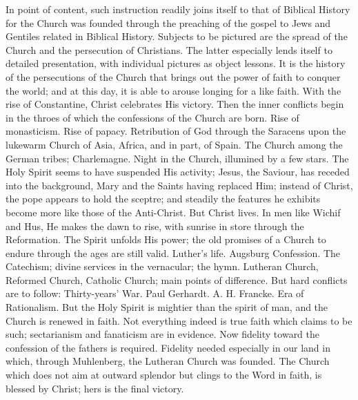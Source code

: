 In point of content, such instruction readily joins itself to that of Biblical History for the Church was founded through the preaching of the gospel to Jews and Gentiles related in Biblical History. Subjects to be pictured are the spread of the Church and the persecution of Christians. The latter especially lends itself to detailed presentation, with individual pictures as object lessons. It is the history of the persecutions of the Church that brings out the power of faith to conquer the world; and at this day, it is able to arouse longing for a like faith. With the rise of Constantine, Christ celebrates His victory. Then the inner conflicts begin in the throes of which the confessions of the Church are born. Rise of monasticism. Rise of papacy. Retribution of God through the Saracens upon the lukewarm Church of Asia, Africa, and in part, of Spain. The Church among the German tribes; Charlemagne. Night in the Church, illumined by a few stars. The Holy Spirit seems to have suspended His activity; Jesus, the
Saviour, has receded into the background, Mary and the Saints having replaced Him; instead of Christ, the pope appears to hold the sceptre; and steadily the features he exhibits become more like those of the Anti-Christ. But Christ lives. In men like Wichif and Hus, He makes the dawn to rise, with sunrise in store through the Reformation. The Spirit unfolds His power; the old promises of a Church to endure through the ages are still valid. Luther’s life. Augsburg Confession. The Catechism; divine services in the vernacular; the hymn. Lutheran Church, Reformed Church, Catholic Church; main points of difference. But hard conflicts are to follow: Thirty-years’ War. Paul Gerhardt. A. H. Francke. Era of Rationalism. But the Holy Spirit is mightier than the spirit of man, and the Church is renewed in faith. Not everything indeed is true faith which claims to be such; sectarianism and fanaticism are in evidence. Now fidelity toward the confession of the fathers is required. Fidelity needed especially in our land in which, through Muhlenberg, the Lutheran Church was founded. The Church which does not aim at outward splendor but clings to the Word in faith, is blessed by Christ; hers is the final victory.


